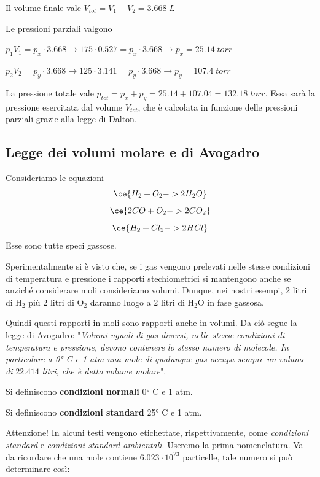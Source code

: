 Il volume finale vale $V_{tot}=V_1 + V_2 =3.668 \; L$

Le pressioni parziali valgono

\vspace{0.2cm}$p_1V_1=p_x \cdot 3.668 \rightarrow 175 \cdot 0.527 = p_x \cdot 3.668 \rightarrow p_x = 25.14 \; torr$

\vspace{0.2cm}$p_2V_2=p_y \cdot 3.668 \rightarrow 125 \cdot 3.141 = p_y \cdot 3.668 \rightarrow p_y = 107.4 \; torr$

\vspace{0.2cm}La pressione totale vale $p_{tot}=p_x + p_y=25.14 + 107.04=132.18 \; torr$. Essa sarà la pressione esercitata dal volume $V_{tot}$, che è calcolata in funzione delle pressioni parziali grazie alla legge di Dalton.
\subsection{Legge dei volumi molare e di Avogadro}
Consideriamo le equazioni
$$\ce{H_2 + O_2 -> 2H_2O}$$
$$\ce{2CO + O_2 -> 2CO_2}$$
$$\ce{H_2 + Cl_2 -> 2HCl}$$
Esse sono tutte speci gassose.

Sperimentalmente si è visto che, se i gas vengono prelevati nelle stesse condizioni di temperatura e pressione i rapporti stechiometrici si mantengono anche se anziché considerare moli consideriamo volumi. Dunque, nei nostri esempi, 2 litri di H$_2$ più 2 litri di O$_2$ daranno luogo a 2 litri di H$_2$O in fase gassosa.

Quindi questi rapporti in moli sono rapporti anche in volumi. Da ciò segue la legge di Avogadro:
"\textit{Volumi uguali di gas diversi, nelle stesse condizioni di temperatura e pressione, devono contenere lo stesso numero di molecole. In particolare a 0° C e 1 atm una mole di qualunque gas occupa sempre un volume di} $22.414$ \textit{litri, che è detto volume molare}".

\vspace{0.2cm}Si definiscono \textbf{condizioni normali} 0° C e 1 atm.

\vspace{0.2cm}Si definiscono \textbf{condizioni standard} 25° C e 1 atm.

\vspace{0.2cm}Attenzione! In alcuni testi vengono etichettate, rispettivamente, come \textit{condizioni standard} e \textit{condizioni standard ambientali}. Useremo la prima nomenclatura.
Va da ricordare che una mole contiene $6.023 \cdot 10^23$ particelle, tale numero si può determinare così:

